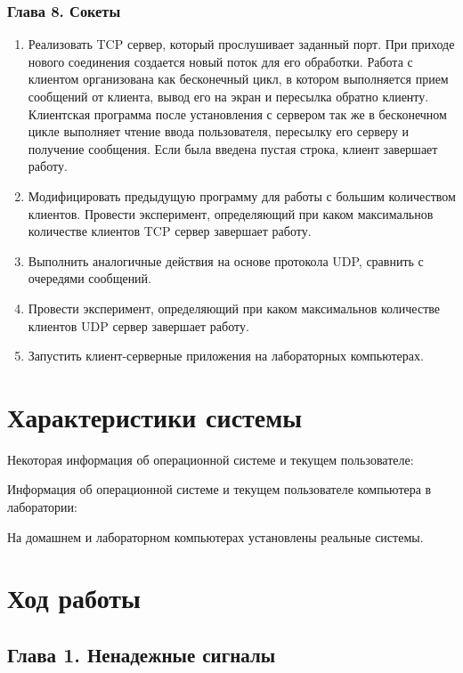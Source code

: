 \documentclass[14pt,a4paper,report]{report}
\begin{document}
\subsubsection{Глава 8. Сокеты}

\begin{enumerate}
	\item Реализовать TCP сервер, который прослушивает заданный порт. При приходе нового соединения создается новый поток для его обработки. Работа с клиентом организована как бесконечный цикл, в котором выполняется прием сообщений от клиента, вывод его на экран и пересылка обратно клиенту. Клиентская программа после установления с сервером так же в бесконечном цикле выполняет чтение ввода пользователя, пересылку его серверу и получение сообщения. Если была введена пустая строка, клиент завершает работу.
	\item Модифицировать предыдущую программу для работы с большим количеством клиентов. Провести эксперимент, определяющий при каком максимальнов количестве клиентов TCP сервер завершает работу.
	\item Выполнить аналогичные действия на основе протокола UDP, сравнить с очередями сообщений.
	\item Провести эксперимент, определяющий при каком максимальнов количестве клиентов UDP сервер завершает работу.
	\item Запустить клиент-серверные приложения на лабораторных компьютерах.
\end{enumerate}

\section{Характеристики системы}

Некоторая информация об операционной системе и текущем пользователе:



Информация об операционной системе и текущем пользователе компьютера в лаборатории:



На домашнем и лабораторном компьютерах установлены реальные системы.

\clearpage

\section{Ход работы}

\subsection{Глава 1. Ненадежные сигналы}
\end{document}
